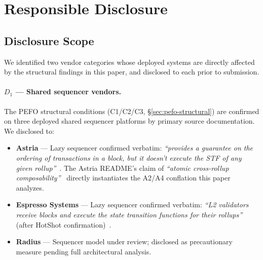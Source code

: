 %
%

\section{Responsible Disclosure}
\label{sec:disclosure}

\subsection{Disclosure Scope}
\label{sec:disclosure-scope}

We identified two vendor categories whose deployed systems are directly
affected by the structural findings in this paper, and disclosed to each
prior to submission.

\paragraph{$D_1$ --- Shared sequencer vendors.}
The PEFO structural conditions (C1/C2/C3, \S\ref{sec:pefo-structural}) are
confirmed on three deployed shared sequencer platforms by primary source
documentation. We disclosed to:

\begin{itemize}
  \item \textbf{Astria} --- Lazy sequencer confirmed verbatim:
    \emph{``provides a guarantee on the ordering of transactions in a block,
    but it doesn't execute the STF of any given rollup''}~\cite{Astria-TxFlow}.
    The Astria README's claim of \emph{``atomic cross-rollup
    composability''}~\cite{Astria-README} directly instantiates the
    A2/A4 conflation this paper analyzes.
  \item \textbf{Espresso Systems} --- Lazy sequencer confirmed verbatim:
    \emph{``L2 validators receive blocks and execute the state transition
    functions for their rollups''} (after HotShot confirmation)~\cite{Espresso-Architecture}.
  \item \textbf{Radius} --- Sequencer model under review; disclosed as
    precautionary measure pending full architectural analysis.
\end{itemize}

